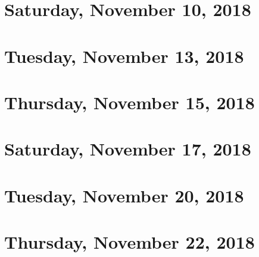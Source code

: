\documentclass[reqno]{amsart}
\begin{document}
\section{Saturday, November 10, 2018}
    
    
\section{Tuesday, November 13, 2018}
    
    
\section{Thursday, November 15, 2018}
    

\section{Saturday, November 17, 2018}
    
    
\section{Tuesday, November 20, 2018}
    

\section{Thursday, November 22, 2018}
    
\end{document}
